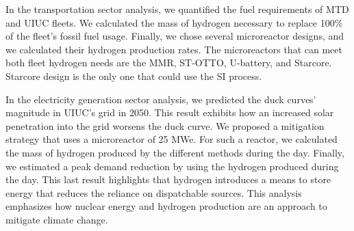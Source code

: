 In the transportation sector analysis, we quantified the fuel requirements of \gls{MTD} and \gls{UIUC} fleets.
We calculated the mass of hydrogen necessary to replace 100$\%$ of the fleet's fossil fuel usage.
Finally, we chose several microreactor designs, and we calculated their hydrogen production rates.
The microreactors that can meet both fleet hydrogen needs are the MMR, ST-OTTO, U-battery, and Starcore.
Starcore design is the only one that could use the \gls{SI} process.

In the electricity generation sector analysis, we predicted the duck curves' magnitude in UIUC's grid in 2050.
This result exhibits how an increased solar penetration into the grid worsens the duck curve.
We proposed a mitigation strategy that uses a microreactor of 25 MWe.
For such a reactor, we calculated the mass of hydrogen produced by the different methods during the day.
Finally, we estimated a peak demand reduction by using the hydrogen produced during the day.
This last result highlights that hydrogen introduces a means to store energy that reduces the reliance on dispatchable sources.
This analysis emphasizes how nuclear energy and hydrogen production are an approach to mitigate climate change.
